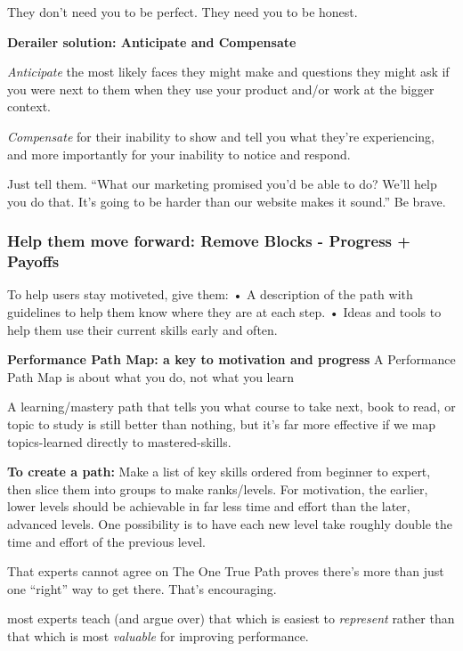 They don’t need you to be perfect. They need you to be honest.

\textbf{Derailer solution:
Anticipate and Compensate}

\textit{Anticipate} the most likely faces they might make and questions they might ask if you were next to them when they use your product and/or work at the bigger context.

\textit{Compensate} for their inability to show and tell you what they’re experiencing, and more importantly for your inability to notice and respond.

Just tell them.
“What our marketing promised you’d be able to do? We’ll help you do that. It’s going to be harder than our website makes it sound.”
Be brave.

\subsubsection{Help them move forward: Remove Blocks - Progress + Payoffs}
To help users stay motiveted, give them:
•  A description of the path with guidelines to help them know where they are at each step.
•  Ideas and tools to help them use their current skills early and often.

\textbf{Performance Path Map: a key to motivation and progress}
A Performance Path Map is about what you do, not what you learn

A learning/mastery path that tells you what course to take next, book to read, or topic to study is still better than nothing, but it’s far more effective if we map topics-learned directly to mastered-skills.

\textbf{To create a path:}
Make a list of key skills ordered from beginner to expert, then slice them into groups to make ranks/levels. For motivation, the earlier, lower levels should be achievable in far less time and effort than the later, advanced levels. One possibility is to have each new level take roughly double the time and effort of the previous level.


That experts cannot agree on The One True Path proves there’s more than just one “right” way to get there. That’s encouraging.

most experts teach (and argue over) that which is easiest to \textit{represent} rather than that which is most \textit{valuable} for improving performance.

